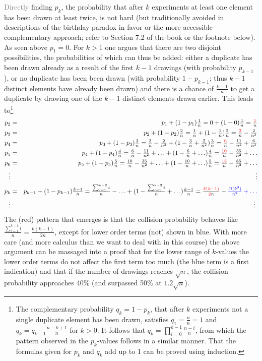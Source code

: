 \documentclass[titlepage]{article}
\theoremstyle{definition}
\numberwithin{equation}{subsection}
\numberwithin{remark}{subsection}
\begin{document}
\textcolor{gray}{Directly} finding $p_k$, the probability that after $k$ experiments at least one element has been drawn at least twice, is not hard (but traditionally avoided in descriptions of the birthday paradox in favor or the more accessible complementary approach; refer to Section 7.2 of the book or the footnote below).
As seen above $p_1=0$. For $k>1$ one argues that there are two disjoint possibilities, the probabilities of which can thus be added: either a duplicate has been drawn already as a result of the first $k-1$ drawings (with probability $p_{k-1}$), or no duplicate has been been drawn (with probability $1-p_{k-1}$; thus $k-1$ distinct elements have already been drawn) and there is a chance of $\frac{k-1}n$ to get a duplicate by drawing one of the $k-1$ distinct elements drawn earlier. This leads to\footnote{The complementary probability $q_k=1-p_k$, that after $k$ experiments not a single duplicate element has been drawn, satisfies $q_1=\frac{n}n=1$ and $q_k=q_{k-1}\frac{n-k+1}{n}$ for $k>0$. It follows that $q_k=\prod_{i=0}^{k-1}\frac{n-i}{n}$, from which the pattern observed in the $p_k$-values follows in a similar manner. That the formulas given for $p_k$ and $q_k$ add up to 1 can be proved using induction.}
\begin{eqnarray*}
p_2&=&p_1+(1-p_1)\textstyle\frac{1}n=0+(1-0)\frac1n=\frac{\color{red}{1}}n\\
p_3&=&p_2+(1-p_2)\textstyle\frac{2}n=\frac1n+(1-\frac1n)\frac2n=\frac{\color{red}{3}}n-\frac2{n^2}\\
p_4&=&p_3+(1-p_3)\textstyle\frac{3}n=\frac3n-\frac2{n^2}+(1-\frac3n+\frac2{n^2})\frac3n=\frac{\color{red}{6}}n-\frac{11}{n^2}+\frac6{n^3}\\
p_5&=&p_4+(1-p_4)\textstyle\frac{4}n=\frac6n-\frac{11}{n^2}+\ldots+(1-\frac6n+\ldots)\frac4n=\frac{\color{red}{10}}n-\frac{35}{n^2}+\ldots\\
p_6&=&p_5+(1-p_5)\textstyle\frac{5}n=\frac{10}n-\frac{35}{n^2}+\ldots+(1-\frac{10}n+\ldots)\frac5n=\frac{\color{red}{15}}n-\frac{85}{n^2}+\ldots\\
\vdots&&\vdots\\
p_k&=&p_{k-1}+(1-p_{k-1})\textstyle\frac{k-1}n=\frac{\sum_{i=1}^{k-2}i}n-\ldots+(1-\frac{\sum_{i=1}^{k-2}i}n+\ldots)\frac{k-1}n=\frac{\color{red}{k(k-1)}}{{\color{red}{2}}n}-{\color{blue}{\frac{O(k^3)}{n^2}+\ldots}}\\
\vdots&&\vdots\
\end{eqnarray*}
The (red) pattern that emerges is that the collision probability behaves like $\frac{\sum_{i=1}^{k-1}i}{n}=\frac{k(k-1)}{2n}$, except for lower order terms (not) shown in blue.
With more care (and more calculus than we want to deal with in this course) the above argument can be massaged into a proof that for the lower range of $k$-values the lower order terms do not affect the first term too much (the blue term is a first indication) and that if the number of drawings reaches $\sqrt n$, the collision probability approaches 40\% (and surpassed 50\% at $1.2\sqrt n$).
\end{document}
